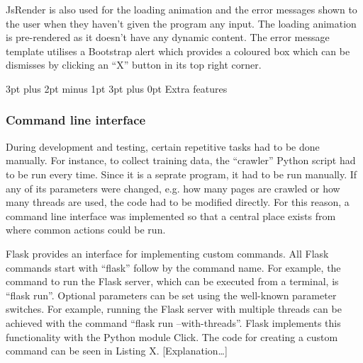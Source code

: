 \documentclass[12pt,a4paper]{article}
\makeatletter
\renewcommand\subsection{\@startsection {subsection}{1}{2mm} %
                                        {3pt plus 2pt minus 1pt} %
                                        {3pt plus 0pt} %
                                        {\normalfont\bfseries}}
\makeatother
\begin{document}
JsRender is also used for the loading animation and the error messages shown to the user when they haven’t given the program any input. The loading animation is pre-rendered as it doesn’t have any dynamic content. The error message template utilises a Bootstrap alert which provides a coloured box which can be dismisses by clicking an “X” button in its top right corner. 

\subsection{Extra features}
\subsubsection{Command line interface}
During development and testing, certain repetitive tasks had to be done manually. For instance, to collect training data, the “crawler” Python script had to be run every time. Since it is a seprate program, it had to be run manually. If any of its parameters were changed, e.g. how many pages are crawled or how many threads are used, the code had to be modified directly. For this reason, a command line interface was implemented so that a central place exists from where common actions could be run. 

Flask provides an interface for implementing custom commands. All Flask commands start with “flask” follow by the command name. For example, the command to run the Flask server, which can be executed from a terminal, is “flask run”. Optional parameters can be set using the well-known parameter switches. For example, running the Flask server with multiple threads can be achieved with the command “flask run --with-threads”. Flask implements this functionality with the Python module Click. The code for creating a custom command can be seen in Listing X. [Explanation…]
\end{document}
